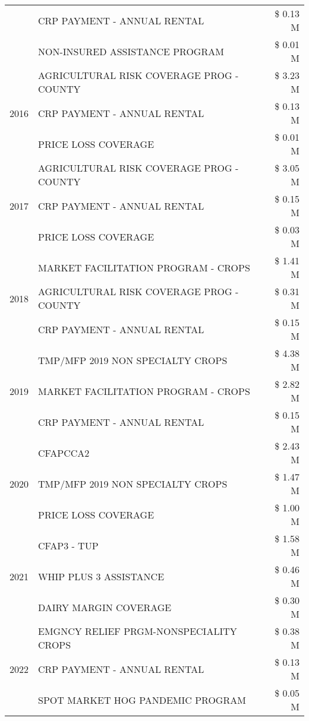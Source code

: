 \begin{tabular}{llr}
 & CRP PAYMENT - ANNUAL RENTAL & \$ 0.13 M \\
 & NON-INSURED ASSISTANCE PROGRAM & \$ 0.01 M \\
\cline{1-3}
\multirow[t]{3}{*}{2016} & AGRICULTURAL RISK COVERAGE PROG - COUNTY & \$ 3.23 M \\
 & CRP PAYMENT - ANNUAL RENTAL & \$ 0.13 M \\
 & PRICE LOSS COVERAGE & \$ 0.01 M \\
\cline{1-3}
\multirow[t]{3}{*}{2017} & AGRICULTURAL RISK COVERAGE PROG - COUNTY & \$ 3.05 M \\
 & CRP PAYMENT - ANNUAL RENTAL & \$ 0.15 M \\
 & PRICE LOSS COVERAGE & \$ 0.03 M \\
\cline{1-3}
\multirow[t]{3}{*}{2018} & MARKET FACILITATION PROGRAM - CROPS & \$ 1.41 M \\
 & AGRICULTURAL RISK COVERAGE PROG - COUNTY & \$ 0.31 M \\
 & CRP PAYMENT - ANNUAL RENTAL & \$ 0.15 M \\
\cline{1-3}
\multirow[t]{3}{*}{2019} & TMP/MFP 2019 NON SPECIALTY CROPS & \$ 4.38 M \\
 & MARKET FACILITATION PROGRAM - CROPS & \$ 2.82 M \\
 & CRP PAYMENT - ANNUAL RENTAL & \$ 0.15 M \\
\cline{1-3}
\multirow[t]{3}{*}{2020} & CFAPCCA2 & \$ 2.43 M \\
 & TMP/MFP 2019 NON SPECIALTY CROPS & \$ 1.47 M \\
 & PRICE LOSS COVERAGE & \$ 1.00 M \\
\cline{1-3}
\multirow[t]{3}{*}{2021} & CFAP3 - TUP & \$ 1.58 M \\
 & WHIP PLUS 3 ASSISTANCE & \$ 0.46 M \\
 & DAIRY MARGIN COVERAGE & \$ 0.30 M \\
\cline{1-3}
\multirow[t]{3}{*}{2022} & EMGNCY RELIEF PRGM-NONSPECIALITY CROPS & \$ 0.38 M \\
 & CRP PAYMENT - ANNUAL RENTAL & \$ 0.13 M \\
 & SPOT MARKET HOG PANDEMIC PROGRAM & \$ 0.05 M \\
\cline{1-3}
\bottomrule
\end{tabular}
